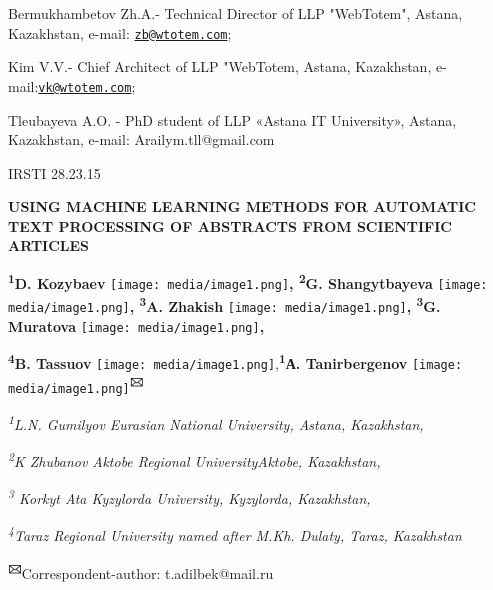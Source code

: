 \documentclass[
]{article}
\begin{document}
Bermukhambetov Zh.A.- Technical Director of LLP "WebTotem", Astana,
Kazakhstan, e-mail:
\href{mailto:zb@wtotem.com}{\nolinkurl{zb@wtotem.com}};

Kim V.V.- Chief Architect of LLP "WebTotem, Astana, Kazakhstan,
e-mail:\href{mailto:vk@wtotem.com}{\nolinkurl{vk@wtotem.com}};

Tleubayeva A.O. - PhD student of LLP «Astana IT University», Astana,
Kazakhstan, e-mail: Arailym.tll@gmail.com

IRSTI 28.23.15

\textbf{USING MACHINE LEARNING METHODS FOR AUTOMATIC TEXT PROCESSING OF
ABSTRACTS FROM SCIENTIFIC ARTICLES}

\textbf{\textsuperscript{1}D. Kozybaev}
\texttt{[image: media/image1.png]}\textbf{,
\textsuperscript{2}G. Shangytbayeva}
\texttt{[image: media/image1.png]}\textbf{,
\textsuperscript{3}A. Zhakish}
\texttt{[image: media/image1.png]}\textbf{,
\textsuperscript{3}G. Muratova}
\texttt{[image: media/image1.png]}\textbf{,}

\textbf{\textsuperscript{4}B. Tassuov}
\texttt{[image: media/image1.png]},\textbf{\textsuperscript{1}А.
Tanirbergenov}
\texttt{[image: media/image1.png]}\textbf{\textsuperscript{🖂}}

\emph{\textsuperscript{1}L.N. Gumilyov Eurasian National University,
Astana, Kazakhstan,}

\emph{\textsuperscript{2}K Zhubanov Aktobe Regional UniversityAktobe,
Kazakhstan,}

\emph{\textsuperscript{3} Korkyt Ata Kyzylorda University, Kyzylorda,
Kazakhstan,}

\emph{\textsuperscript{4}Taraz Regional University named after M.Kh.
Dulaty, Taraz, Kazakhstan}

\textbf{\textsuperscript{🖂}}Correspondent-author: t.adilbek@mail.ru
\end{document}
